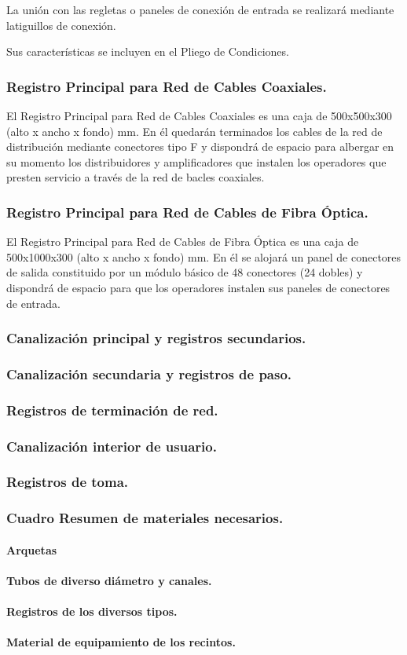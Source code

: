 La unión con las regletas o paneles de conexión de entrada se realizará mediante latiguillos de conexión.

Sus características se incluyen en el Pliego de Condiciones.

\subsubsection*{Registro Principal para Red de Cables Coaxiales.}
El Registro Principal para Red de Cables Coaxiales es una caja de 500x500x300 (alto x ancho x fondo) mm.
En él quedarán terminados los cables de la red de distribución mediante conectores tipo F y dispondrá de espacio para albergar en su momento los distribuidores y amplificadores que instalen los operadores que presten servicio a través de la red de bacles coaxiales.

\subsubsection*{Registro Principal para Red de Cables de Fibra Óptica.}
El Registro Principal para Red de Cables de Fibra Óptica es una caja de 500x1000x300 (alto x ancho x fondo) mm.
En él se alojará un panel de conectores de salida constituido por un módulo básico de 48 conectores (24 dobles) y dispondrá de espacio para que los operadores instalen sus paneles de conectores de entrada.
\subsubsection{Canalización principal y registros secundarios.}
\subsubsection{Canalización secundaria y registros de paso.}
\subsubsection{Registros de terminación de red.}
\subsubsection{Canalización interior de usuario.}
\subsubsection{Registros de toma.}
\subsubsection{Cuadro Resumen de materiales necesarios.}
\paragraph{Arquetas}
\paragraph{Tubos de diverso diámetro y canales.}
\paragraph{Registros de los diversos tipos.}
\paragraph{Material de equipamiento de los recintos.}